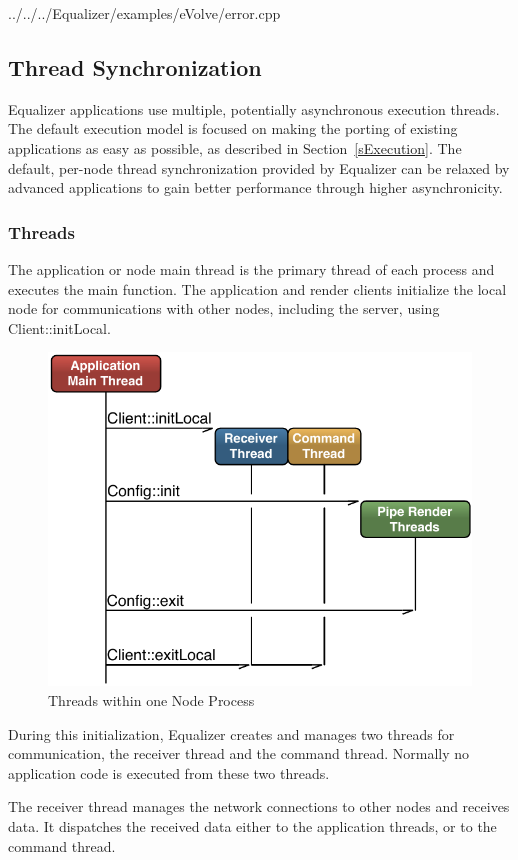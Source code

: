 \documentclass[10pt,a4]{scrartcl}
\newcommand{\sref}[1]{Section~\ref{#1}}
\begin{document}
{\footnotesize
  {../../../Equalizer/examples/eVolve/error.cpp}}


\subsection{\label{sThreads}Thread Synchronization}

Equalizer applications use multiple, potentially asynchronous execution
threads. The default execution model is focused on making the porting of
existing applications as easy as possible, as described in
\sref{sExecution}. The default, per-node thread synchronization provided
by Equalizer can be relaxed by advanced applications to gain better
performance through higher asynchronicity.

\subsubsection{Threads}

The application or node main thread is the primary thread of each
process and executes the \textsf{main} function. The application and
render clients initialize the local node for communications with other
nodes, including the server, using \textsf{Client::initLocal}.

\begin{figure}
  \includegraphics[width=.618\textwidth]{images/threads.pdf}
  {\caption{\label{fThreads}Threads within one Node Process}}
\end{figure}
During this initialization, Equalizer creates and manages two threads
for communication, the receiver thread and the command thread. Normally
no application code is executed from these two threads.

The receiver thread manages the network connections to other nodes and
receives data. It dispatches the received data either to the application
threads, or to the command thread.
\end{document}
